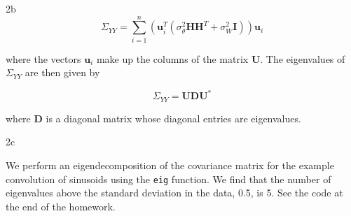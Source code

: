 \documentclass{article}
\begin{document}
\begin{homeworkProblem}
\begin{homeworkSection}{2b}
        \begin{equation*}
            \Sigma_{YY} = \sum_{i=1}^n (\bm{u}_i^T (\sigma_\theta^2 \bm{HH}^T +
            \sigma_W^2 \bm{I})) \bm{u}_i
        \end{equation*}

        \noindent where the vectors $\bm{u}_i$ make up the columns of the
        matrix $\bm{U}$. The eigenvalues of $\Sigma_{YY}$ are then given by

        \begin{equation*}
            \Sigma_{YY} = \bm{UDU}^*
        \end{equation*}

        \noindent where $\bm{D}$ is a diagonal matrix whose diagonal entries
        are eigenvalues.

    \end{homeworkSection}

    \begin{homeworkSection}{2c}

        We perform an eigendecomposition of the covariance matrix for the
        example convolution of sinusoids using the \texttt{eig} function. We
        find that the number of eigenvalues above the standard deviation in the
        data, 0.5, is 5. See the code at the end of the homework.

    \end{homeworkSection}


\end{homeworkProblem}
\end{document}
